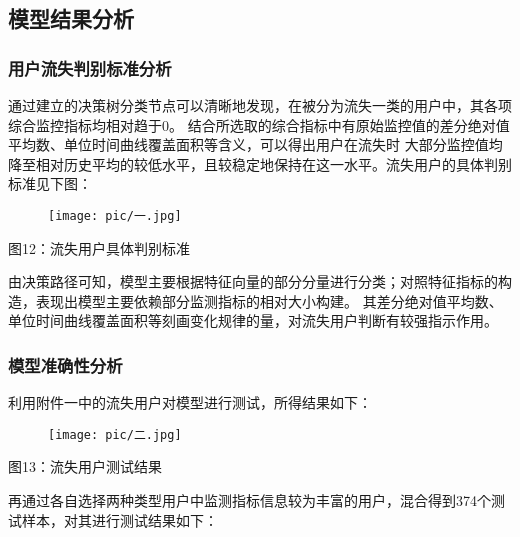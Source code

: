 \documentclass{ctexart}
\begin{document}
    \subsection{模型结果分析}
        \subsubsection{用户流失判别标准分析}
        通过建立的决策树分类节点可以清晰地发现，在被分为流失一类的用户中，其各项综合监控指标均相对趋于0。
        结合所选取的综合指标中有原始监控值的差分绝对值平均数、单位时间曲线覆盖面积等含义，可以得出用户在流失时
        大部分监控值均降至相对历史平均的较低水平，且较稳定地保持在这一水平。流失用户的具体判别标准见下图：\\

        \begin{center}
            \begin{figure}[H]
                \begin{center}
                    \texttt{[image: pic/一.jpg]}
                \end{center}
            \end{figure}
            图12：流失用户具体判别标准
        \end{center}
        

        由决策路径可知，模型主要根据特征向量的部分分量进行分类；对照特征指标的构造，表现出模型主要依赖部分监测指标的相对大小构建。
        其差分绝对值平均数、单位时间曲线覆盖面积等刻画变化规律的量，对流失用户判断有较强指示作用。
        
        \subsubsection{模型准确性分析}
        利用附件一中的流失用户对模型进行测试，所得结果如下：\\

        \begin{center}
            \begin{figure}[H]
                \begin{center}
                    \texttt{[image: pic/二.jpg]}
                \end{center}
            \end{figure}
            图13：流失用户测试结果
        \end{center}

        再通过各自选择两种类型用户中监测指标信息较为丰富的用户，混合得到374个测试样本，对其进行测试结果如下：\\
\end{document}
